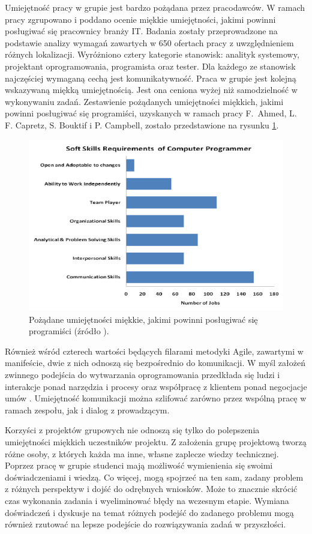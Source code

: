 Umiejętność pracy w grupie jest bardzo pożądana przez pracodawców.
W ramach pracy \cite{soft-skills} zgrupowano i poddano ocenie miękkie umiejętności, jakimi powinni posługiwać się pracownicy branży IT.
Badania zostały przeprowadzone na podstawie analizy wymagań zawartych w 650 ofertach pracy z uwzględnieniem różnych lokalizacji.
Wyróżniono cztery kategorie stanowisk: analityk systemowy, projektant oprogramowania, programista oraz tester.
Dla każdego ze stanowisk najczęściej wymaganą cechą jest komunikatywność.
Praca w grupie jest kolejną wskazywaną miękką umiejętnością.
Jest ona ceniona wyżej niż samodzielność w wykonywaniu zadań.
Zestawienie pożądanych umiejętności miękkich, jakimi powinni posługiwać się programiści, uzyskanych w ramach pracy F.~Ahmed, L. F. Capretz, S. Bouktif i P. Campbell, zostało przedstawione na rysunku \ref{fig:soft-skills}.

\begin{figure}[h]
    \centering
    \includegraphics[width = 13cm]{chapter01/soft-skills.png}
    \caption{Pożądane umiejętności miękkie, jakimi powinni posługiwać się programiści (źródło \cite{soft-skills}).}
    \label{fig:soft-skills}
\end{figure}

Również wśród czterech wartości będących filarami metodyki Agile, zawartymi w manifeście, dwie z nich odnoszą się bezpośrednio do komunikacji.
W myśl założeń zwinnego podejścia do wytwarzania oprogramowania przedkłada się ludzi i interakcje ponad narzędzia i procesy oraz współpracę z klientem ponad negocjacje umów \cite{agile-manifesto}.
Umiejętność komunikacji można szlifować zarówno przez wspólną pracę w ramach zespołu, jak i dialog z prowadzącym.

Korzyści z projektów grupowych nie odnoszą się tylko do polepszenia umiejętności miękkich uczestników projektu.
Z założenia grupę projektową tworzą różne osoby, z których każda ma inne, własne zaplecze wiedzy technicznej.
Poprzez pracę w grupie studenci mają możliwość wymienienia się swoimi doświadczeniami i wiedzą.
Co więcej, mogą spojrzeć na ten sam, zadany problem z różnych perspektyw i dojść do odrębnych wniosków.
Może to znacznie skrócić czas wykonania zadania i wyeliminować błędy na wczesnym etapie. 
Wymiana doświadczeń i dyskusje na temat różnych podejść do zadanego problemu mogą również rzutować na lepsze podejście do rozwiązywania zadań w przyszłości.

